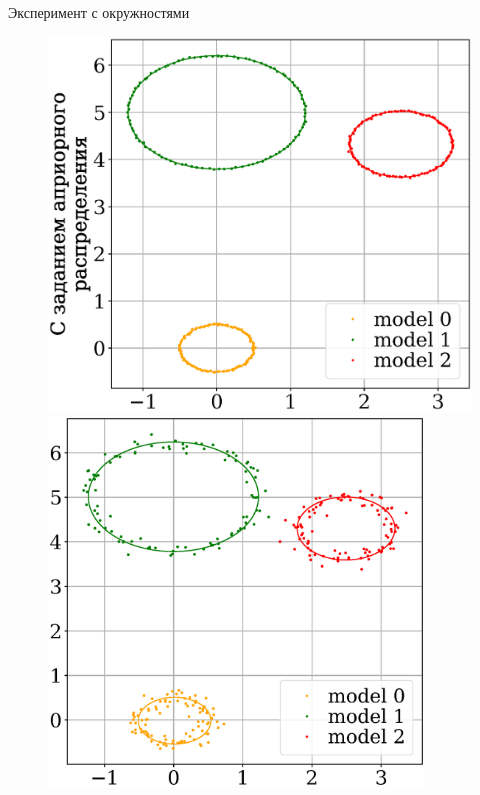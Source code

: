 \documentclass[10pt,pdf,hyperref={unicode}]{beamer}
\begin{document}
\begin{frame}{Эксперимент с окружностями}
\begin{figure}[h!]
\begin{minipage}{.32\textwidth}
      \includegraphics[width =  \textwidth]{figures/910.eps}
\end{minipage}
\begin{minipage}{.32\textwidth}
\hspace{0.3mm}
      \includegraphics[width =  0.89\textwidth]{figures/901.eps}
\end{minipage}

\end{figure}
\end{frame}
\end{document}
